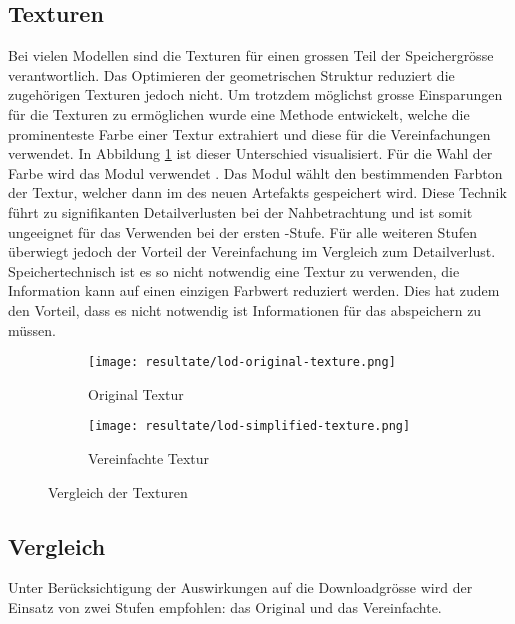 \subsection{Texturen}

Bei vielen Modellen sind die Texturen für einen grossen Teil der Speichergrösse verantwortlich. Das Optimieren der geometrischen Struktur reduziert die zugehörigen Texturen jedoch nicht. Um trotzdem möglichst grosse Einsparungen für die Texturen zu ermöglichen wurde eine Methode entwickelt, welche die prominenteste Farbe einer Textur extrahiert und diese für die Vereinfachungen verwendet.
In Abbildung \ref{fig:textureComparison} ist dieser Unterschied visualisiert. Für die Wahl der Farbe wird das Modul  verwendet \cite{averageColorPackage}. Das Modul wählt den bestimmenden Farbton der Textur, welcher dann im  des neuen Artefakts gespeichert wird.
Diese Technik führt zu signifikanten Detailverlusten bei der Nahbetrachtung und ist somit ungeeignet für das Verwenden bei der ersten -Stufe. Für alle weiteren Stufen überwiegt jedoch der Vorteil der Vereinfachung im Vergleich zum Detailverlust.
Speichertechnisch ist es so nicht notwendig eine Textur zu verwenden, die Information kann auf einen einzigen Farbwert reduziert werden. Dies hat zudem den Vorteil, dass es nicht notwendig ist Informationen für das  abspeichern zu müssen.

\begin{figure}[H]
  \centering
  \begin{subfigure}{.4\textwidth}
    \centering
    \texttt{[image: resultate/lod-original-texture.png]}
    \caption{Original Textur}
  \end{subfigure}
  \begin{subfigure}{.4\textwidth}
    \centering
    \texttt{[image: resultate/lod-simplified-texture.png]}
    \caption{Vereinfachte Textur}
  \end{subfigure}
  \caption{Vergleich der Texturen}
  \label{fig:textureComparison}
\end{figure}

\subsection{Vergleich}

Unter Berücksichtigung der Auswirkungen auf die Downloadgrösse wird der Einsatz von zwei Stufen empfohlen: das Original und das Vereinfachte.

